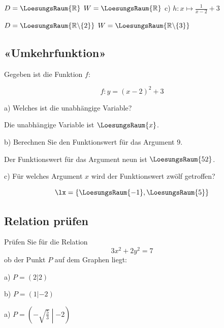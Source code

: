 
$D = \LoesungsRaum{\mathbb{R}}$
\vspace{5mm}
$W = \LoesungsRaum{\mathbb{R}}$
\newpage
c) $h: x\mapsto \frac{1}{x-2}+3$


$D = \LoesungsRaum{\mathbb{R}\backslash{} \{2\}}$
\vspace{5mm}
$W = \LoesungsRaum{\mathbb{R}\backslash{} \{3\}}$
\newpage

\subsection{«Umkehrfunktion»}
Gegeben ist die Funktion $f$:

$$f: y=(x-2)^2 + 3$$


a) Welches ist die unabhängige Variable?
\vspace{5mm}

Die unabhängige Variable ist $\LoesungsRaum{x}$.
\vspace{5mm}

b) Berechnen Sie den Funktionswert für das Argument $9$.
\vspace{5mm}

Der Funktionswert für das Argument neun ist $\LoesungsRaum{52}$.



c) Für welches Argument $x$ wird der Funktionswert zwölf getroffen?

$$\lx = \{\LoesungsRaum{-1}, \LoesungsRaum{5}\}$$


\subsection{Relation prüfen}
Prüfen Sie für die Relation $$3x^2 + 2y^2 = 7$$ ob der Punkt $P$ auf
dem Graphen liegt:

a) $P=(2|2)$  

\vspace{5mm}
b) $P=(1|-2)$  

\vspace{5mm}
a) $P=\left(-\sqrt{\frac{5}{3}}\middle | -2\right)$  

\vspace{5mm}




